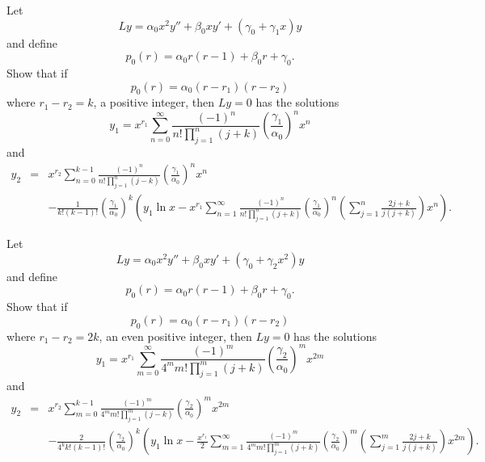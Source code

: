 \begin{exerciselist}
  \item\label{exer:7.7.46} Let
  \[
    Ly=\alpha_{0}x^{2}y''+\beta_{0}xy'+(\gamma_{0}+\gamma_{1}x)y
  \]
  and define
  \[
    p_{0}(r)=\alpha_{0}r(r-1)+\beta_{0}r+\gamma_{0}.
  \]
  Show that if
  \[
    p_{0}(r)=\alpha_{0}(r-r_{1})(r-r_{2})
  \]
  where $r_{1}-r_{2}=k$, a positive integer, then $Ly=0$ has the solutions
  \[
    y_{1}=x^{r_{1}}\sum_{n=0}^{\infty}\frac{(-1)^{n}}{n!\prod_{j=1}^{n}(j+k)}\left(\frac{\gamma_{1}}{\alpha_{0}}\right)^{n}x^{n}
  \]
  and
  \begin{eqnarray*}
    y_{2} & = & x^{r_{2}}\sum_{n=0}^{k-1}\frac{(-1)^{n}}{n!\prod_{j=1}^{n}(j-k)}\left(\frac{\gamma_{1}}{\alpha_{0}}\right)^{n}x^{n} \\[10pt]
          &   & -\frac{1}{k!(k-1)!}\left(\frac{\gamma_{1}}{\alpha_{0}}\right)^{k}\left(y_{1}\ln x-x^{r_{1}}\sum_{n=1}^{\infty}\frac{(-1)^{n}}{n!\prod_{j=1}^{n}(j+k)}\left(\frac{\gamma_{1}}{\alpha_{0}}\right)^{n}\left(\sum_{j=1}^{n}\frac{2j+k}{j(j+k)}\right)x^{n}\right).
  \end{eqnarray*}

  \item\label{exer:7.7.47} Let
  \[
    Ly=\alpha_{0}x^{2}y''+\beta_{0}xy'+(\gamma_{0}+\gamma_{2}x^{2})y
  \]
  and define
  \[
    p_{0}(r)=\alpha_{0}r(r-1)+\beta_{0}r+\gamma_{0}.
  \]
  Show that if
  \[
    p_{0}(r)=\alpha_{0}(r-r_{1})(r-r_{2})
  \]
  where $r_{1}-r_{2}=2k$, an even positive integer, then $Ly=0$ has the solutions
  \[
    y_{1}=x^{r_{1}}\sum_{m=0}^{\infty}\frac{(-1)^{m}}{4^{m}m!\prod_{j=1}^{m}(j+k)}\left(\frac{\gamma_{2}}{\alpha_{0}}\right)^{m}x^{2m}
  \]
  and
  \begin{eqnarray*}
    y_{2} & = & x^{r_{2}}\sum_{m=0}^{k-1}\frac{(-1)^{m}}{4^{m}m!\prod_{j=1}^{m}(j-k)}\left(\frac{\gamma_{2}}{\alpha_{0}}\right)^{m}x^{2m} \\[10pt]
          &   & -\frac{2}{4^{k}k!(k-1)!}\left(\frac{\gamma_{2}}{\alpha_{0}}\right)^{k}\left(y_{1}\ln x-\frac{x^{r_{1}}}{2}\sum_{m=1}^{\infty}\frac{(-1)^{m}}{4^{m}m!\prod_{j=1}^{m}(j+k)}\left(\frac{\gamma_{2}}{\alpha_{0}}\right)^{m}\left(\sum_{j=1}^{m}\frac{2j+k}{j(j+k)}\right)x^{2m}\right).
  \end{eqnarray*}


\end{exerciselist}
